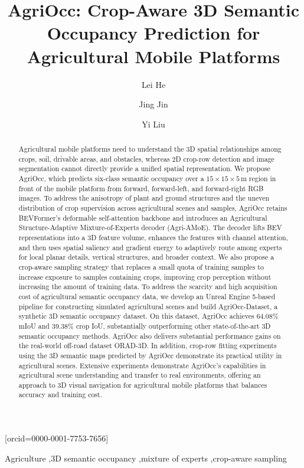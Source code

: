 \documentclass[a4paper,fleqn]{cas-sc}
\begin{document}
\let\WriteBookmarks\relax
\def\floatpagepagefraction{1}
\def\textpagefraction{.001}
\title[mode=title]{AgriOcc: Crop-Aware 3D Semantic Occupancy Prediction for Agricultural Mobile Platforms}
\author[1]{Lei He}
\author[1]{Jing Jin}[orcid=0000-0001-7753-7656]
\cormark[1]
\author[2]{Yi Liu}

\begin{abstract}
Agricultural mobile platforms need to understand the 3D spatial relationships among crops, soil, drivable areas, and obstacles, whereas 2D crop-row detection and image segmentation cannot directly provide a unified spatial representation.
We propose AgriOcc, which predicts six-class semantic occupancy over a $15\times15\times5\,\mathrm{m}$ region in front of the mobile platform from forward, forward-left, and forward-right RGB images.
To address the anisotropy of plant and ground structures and the uneven distribution of crop supervision across agricultural scenes and samples, AgriOcc retains BEVFormer's deformable self-attention backbone and introduces an Agricultural Structure-Adaptive Mixture-of-Experts decoder (Agri-AMoE).
The decoder lifts BEV representations into a 3D feature volume, enhances the features with channel attention, and then uses spatial saliency and gradient energy to adaptively route among experts for local planar details, vertical structures, and broader context.
We also propose a crop-aware sampling strategy that replaces a small quota of training samples to increase exposure to samples containing crops, improving crop perception without increasing the amount of training data.
To address the scarcity and high acquisition cost of agricultural semantic occupancy data, we develop an Unreal Engine 5-based pipeline for constructing simulated agricultural scenes and build AgriOcc-Dataset, a synthetic 3D semantic occupancy dataset.
On this dataset, AgriOcc achieves 64.08\% mIoU and 39.38\% crop IoU, substantially outperforming other state-of-the-art 3D semantic occupancy methods.
AgriOcc also delivers substantial performance gains on the real-world off-road dataset ORAD-3D. In addition, crop-row fitting experiments using the 3D semantic maps predicted by AgriOcc demonstrate its practical utility in agricultural scenes.
Extensive experiments demonstrate AgriOcc's capabilities in agricultural scene understanding and transfer to real environments, offering an approach to 3D visual navigation for agricultural mobile platforms that balances accuracy and training cost.

\end{abstract}
\begin{keywords}
Agriculture \sep 3D semantic occupancy \sep mixture of experts \sep crop-aware sampling
\end{keywords}
\maketitle
\end{document}
